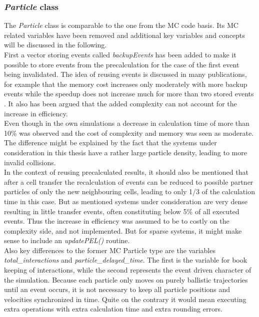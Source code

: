 \subsubsection{\textit{Particle} class}
\label{sec:particle_class}
The \textit{Particle} class is comparable to the one from the MC code basis. Its MC related variables have been removed and additional key variables and concepts will be discussed in the following.\\

First a vector storing events called \textit{backupEvents} has been added to make it possible to store events from the precalculation for the case of the first event being invalidated. The idea of reusing events is discussed in many publications, for example that the memory cost increases only moderately with more backup events while the speedup does not increase much for more than two stored events \cite{Bannerman2011}. It also has been argued that the added complexity can not account for the increase in efficiency\cite{DONEV2005}.\\ 
Even though in the own simulations a decrease in calculation time of more than 10\% was observed and the cost of complexity and memory was seen as moderate. The difference might be explained by the fact that the systems under consideration in this thesis have a rather large particle density, leading to more invalid collisions.\\

In the context of reusing precalculated results, it should also be mentioned that after a cell transfer the recalculation of events can be reduced to possible partner particles of only the new neighbouring cells, leading to only 1/3 of the calculation time in this case. But as mentioned systems under consideration are very dense resulting in little transfer events, often constituting below 5\% of all executed events. Thus the increase in efficiency was assumed to be to costly on the complexity side, and not implemented. But for sparse systems, it might make sense to include an \textit{updatePEL()} routine.\\


Also key differences to the former MC Particle type are the variables \textit{total\_interactions} and \textit{particle\_delayed\_time}. The first is the variable for book keeping of interactions, while the second represents the event driven character of the simulation. Because each particle only moves on purely ballistic trajectories until an event occurs, it is not necessary to keep all particle positions and velocities synchronized in time. Quite on the contrary it would mean executing extra operations with extra calculation time and extra rounding errors.\\

